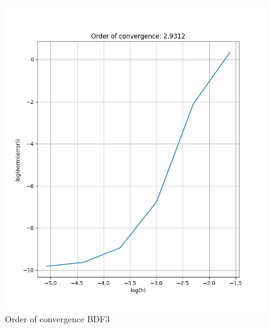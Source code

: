 \documentclass[a4paper]{article}
\begin{document}
\begin{figure}[ht!]
\centering
\includegraphics[scale=0.5]{Figure_2.png}
\caption{Order of convergence BDF3}
\label{fig:dig}
\end{figure}







\end{document}
